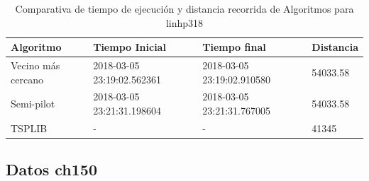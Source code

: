 \documentclass{article}
\begin{document}
\begin{table}[H]
\centering
\caption{Comparativa de tiempo de ejecución y distancia recorrida de Algoritmos para linhp318}
\label{Table:linhp318}
\begin{tabular}{| l | l | l | l |}
\hline
Algoritmo & Tiempo Inicial & Tiempo final & Distancia \\ \hline
Vecino más cercano & 2018-03-05 23:19:02.562361 & 2018-03-05 23:19:02.910580 & 54033.58 \\ \hline
Semi-pilot & 2018-03-05 23:21:31.198604 & 2018-03-05 23:21:31.767005 & 54033.58 \\ \hline
TSPLIB & - & - & 41345 \\ \hline

\end{tabular}
\end{table}

\subsection{Datos ch150}
\end{document}
